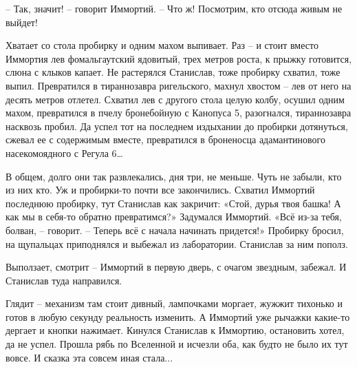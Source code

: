 \documentclass[ebook,oneside,final,openright]{memoir}
\begin{document}
– Так, значит! – говорит Иммортий. – Что ж! Посмотрим, кто отсюда живым не выйдет!\par
\par
Хватает со стола пробирку и одним махом выпивает. Раз – и стоит вместо Иммортия лев фомальгаутский ядовитый, трех метров роста, к прыжку готовится, слюна с клыков капает. Не растерялся Станислав, тоже пробирку схватил, тоже выпил. Превратился в тираннозавра ригельского, махнул хвостом – лев от него на десять метров отлетел. Схватил лев с другого стола целую колбу, осушил одним махом, превратился в пчелу бронебойную с Канопуса 5, разогнался, тираннозавра насквозь пробил. Да успел тот на последнем издыхании до пробирки дотянуться, сжевал ее с содержимым вместе, превратился в броненосца адамантинового насекомоядного с Регула 6…\par
\par
В общем, долго они так развлекались, дня три, не меньше. Чуть не забыли, кто из них кто. Уж и пробирки-то почти все закончились. Схватил Иммортий последнюю пробирку, тут Станислав как закричит: «Стой, дурья твоя башка! А как мы в себя-то обратно превратимся?» Задумался Иммортий. «Всё из-за тебя, болван, – говорит. – Теперь всё с начала начинать придется!» Пробирку бросил, на щупальцах приподнялся и выбежал из лаборатории. Станислав за ним пополз.\par
\par
Выползает, смотрит – Иммортий в первую дверь, с очагом звездным, забежал. И Станислав туда направился.\par
\par
Глядит – механизм там стоит дивный, лампочками моргает, жужжит тихонько и готов в любую секунду реальность изменить. А Иммортий уже рычажки какие-то дергает и кнопки нажимает. Кинулся Станислав к Иммортию, остановить хотел, да не успел. Прошла рябь по Вселенной и исчезли оба, как будто не было их тут вовсе. И сказка эта совсем иная стала...\par
\end{document}
